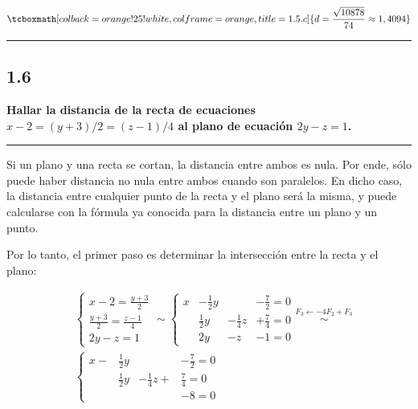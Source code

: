 \documentclass{article}
\begin{document}
\begin{equation}
\tcboxmath[colback=orange!25!white,colframe=orange,title=1.5.c]
{ d = \frac{\sqrt{10878}}{74} \approx 1,4094 }
\end{equation}

\hrule
\vspace{10 pt}

\subsection*{1.6}
\label{subsec:1.6}

\textbf{Hallar la distancia de la recta de ecuaciones $x - 2 = (y + 3)/2 = (z-1)/4$ al plano de ecuación $2y -z = 1$.} 
\vspace{10 pt}
\hrule
\vspace{10 pt}

Si un plano y una recta se cortan, la distancia entre ambos es nula. Por ende, sólo puede haber distancia no nula entre ambos cuando son paralelos. En dicho caso, la distancia entre cualquier punto de la recta y el plano será la misma, y puede calcularse con la fórmula ya conocida para la distancia entre un plano y un punto.

Por lo tanto, el primer paso es determinar la intersección entre la recta y el plano:

\begin{subequations}
\begin{align}
& \left\{ \begin{array}{ll}
x-2 = \frac{y+3}{2} \\
\frac{y+3}{2} = \frac{z - 1}{4} \\
2y -z = 1
\end{array} \right. \sim \left\{ \begin{array}{lllr}
x&-\frac{1}{2}y & &- \frac{7}{2} = 0 \\
&\frac{1}{2}y &-\frac{1}{4}z &+ \frac{7}{4} = 0 \label{eq:1.6} \\
&2y &- z &- 1 = 0
\end{array} \right. \overset{F_3 \leftarrow -4 F_2 + F_3}{\sim} \\
& \left\{ \begin{array}{lllr}
x -&\frac{1}{2} y &&-\frac{7}{2} = 0 \\
&\frac{1}{2} y &-\frac{1}{4}z + &\frac{7}{4} = 0 \\
&&&-8 = 0
\end{array} \right.
\end{align}
\end{subequations}
\end{document}
